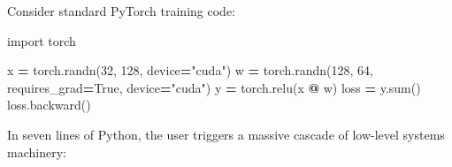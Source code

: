 \documentclass[
  letterpaper,
]{scrbook}
\newenvironment{Shaded}{\begin{snugshade}}{\end{snugshade}}
\newcommand{\BuiltInTok}[1]{#1}
\newcommand{\DecValTok}[1]{\textcolor[rgb]{0.00,0.00,0.81}{#1}}
\newcommand{\ImportTok}[1]{#1}
\newcommand{\NormalTok}[1]{#1}
\newcommand{\OperatorTok}[1]{\textcolor[rgb]{0.81,0.36,0.00}{\textbf{#1}}}
\newcommand{\StringTok}[1]{\textcolor[rgb]{0.31,0.60,0.02}{#1}}
\newcommand{\VariableTok}[1]{\textcolor[rgb]{0.00,0.00,0.00}{#1}}
\begin{document}
Consider standard PyTorch training code:

\begin{Shaded}
\begin{Highlighting}[]
\ImportTok{import}\NormalTok{ torch}

\NormalTok{x }\OperatorTok{=}\NormalTok{ torch.randn(}\DecValTok{32}\NormalTok{, }\DecValTok{128}\NormalTok{, device}\OperatorTok{=}\StringTok{"cuda"}\NormalTok{)}
\NormalTok{w }\OperatorTok{=}\NormalTok{ torch.randn(}\DecValTok{128}\NormalTok{, }\DecValTok{64}\NormalTok{, requires\_grad}\OperatorTok{=}\VariableTok{True}\NormalTok{, device}\OperatorTok{=}\StringTok{"cuda"}\NormalTok{)}
\NormalTok{y }\OperatorTok{=}\NormalTok{ torch.relu(x }\OperatorTok{@}\NormalTok{ w)}
\NormalTok{loss }\OperatorTok{=}\NormalTok{ y.}\BuiltInTok{sum}\NormalTok{()}
\NormalTok{loss.backward()}
\end{Highlighting}
\end{Shaded}

In seven lines of Python, the user triggers a massive cascade of
low-level systems machinery:
\end{document}
